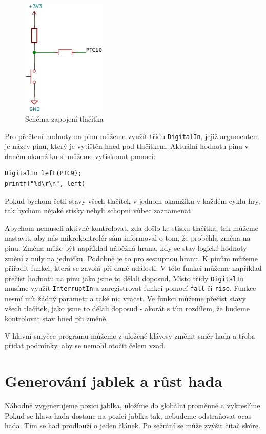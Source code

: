 \documentclass[12pt]{article}
\begin{document}
\begin{figure}[ht]
\centering
  \includegraphics[width=4cm]{figures/button}
\caption{Schéma zapojení tlačítka}
 \label{fig:button}
\end{figure}
\FloatBarrier

Pro přečtení hodnoty na pinu můžeme využít třídu \texttt{DigitalIn}, jejiž argumentem je název pinu, který je vytištěn hned pod tlačítkem.
Aktuální hodnotu pinu v daném okamžiku si můžeme vytisknout pomocí:
\begin{verbatim}
DigitalIn left(PTC9);
printf("%d\r\n", left)
\end{verbatim}

Pokud bychom četli stavy všech tlačítek v jednom okamžiku v každém cyklu hry, tak bychom nějaké stisky nebyli schopni vůbec zaznamenat. 

Abychom nemuseli aktivně kontrolovat, zda došlo ke stisku tlačítka, tak můžeme nastavit, aby nás mikrokontrolér sám informoval o tom, že proběhla změna na pinu.
Změna může být například náběžná hrana, kdy se stav logické hodnoty změní z nuly na jedničku.
Podobně je to pro sestupnou hranu.
K pinům můžeme přiřadit funkci, která se zavolá při dané události.
V této funkci můžeme například přečíst hodnotu na pinu jako jsme to dělali doposud.
Místo třídy \texttt{DigitalIn} musíme využít \texttt{InterruptIn} a zaregistrovat funkci pomocí \texttt{fall} či \texttt{rise}.
Funkce nesmí mít žádný parametr a také nic vracet.
Ve funkci můžeme přečíst stavy všech tlačítek, jako jsme to dělali doposud - akorát s tím rozdílem, že budeme kontrolovat stav hned při změně.

V hlavní smyčce programu můžeme z uložené klávesy změnit směr hada a třeba přidat podmínky, aby se nemohl otočit čelem vzad.

\section{Generování jablek a růst hada}
Náhodně vygenerujeme pozici jablka, uložíme do globální proměnné a vykreslíme.
Pokud se hlava hada dostane na pozici jablka tak, nebudeme odstraňovat ocas hada.
Tím se had prodlouží o jeden článek.
Po sežrání se může zvýšit čítač skóre.
\end{document}
